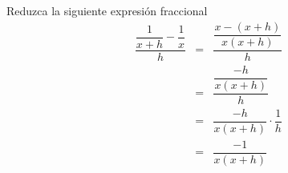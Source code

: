 \begin{myexample}
Reduzca la siguiente expresión fraccional
\begin{eqnarray*}
\dfrac{\dfrac{1}{x+h}-\dfrac{1}{x}}{h}&=&\dfrac{\dfrac{x-(x+h)}{x(x+h)}}{h}\\
&=&\dfrac{\dfrac{-h}{x(x+h)}}{h}\\
&=&\dfrac{-h}{x(x+h)}\cdot \dfrac{1}{h}\\
&=&\dfrac{-1}{x(x+h)}
\end{eqnarray*}
\end{myexample}